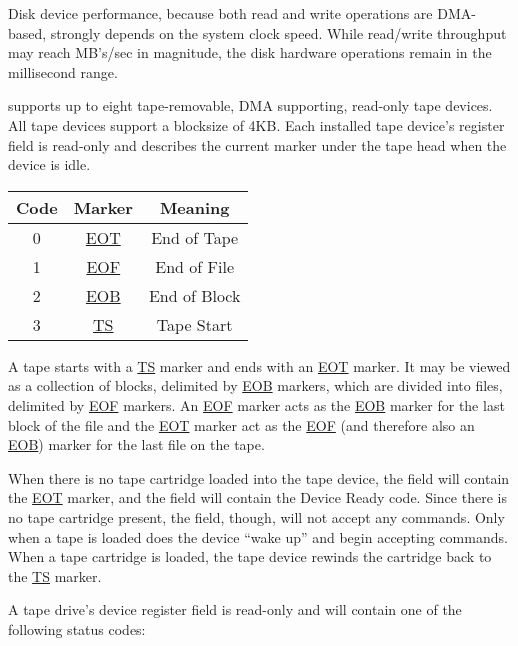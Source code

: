 Disk device performance, because both read and write operations are DMA-based, strongly depends on the system clock speed. 
While read/write throughput may reach MB’s/sec in magnitude, the disk hardware operations remain in the millisecond range.



\uarm{} supports up to eight tape-removable, DMA supporting, read-only tape devices.
All \uarm{} tape devices support a blocksize of 4KB. 
Each installed tape device’s register  field is read-only and describes the current marker under the tape head when the device is idle.

\begin{center}
	\begin{tabular}{|c|c|c|}
		\hline
		Code & Marker & Meaning\\
		\hline
		\hline
		0 & \uline{EOT} & End of Tape\\
		\hline
		1 & \uline{EOF} & End of File\\
		\hline
		2 & \uline{EOB} & End of Block\\
		\hline
		3 & \uline{TS} & Tape Start\\
		\hline
	\end{tabular}
\end{center}

A tape starts with a \uline{TS} marker and ends with an \uline{EOT} marker. 
It may be viewed as a collection of blocks, delimited by \uline{EOB} markers, which are divided into files, delimited by \uline{EOF} markers. 
An \uline{EOF} marker acts as the \uline{EOB} marker for the last block of the file and the \uline{EOT} marker act as the \uline{EOF} (and therefore also an \uline{EOB}) marker for the last file on the tape.

When there is no tape cartridge loaded into the tape device, the  field will contain the \uline{EOT} marker, and the  field will contain the Device Ready code. 
Since there is no tape cartridge present, the  field, though, will not accept any commands. 
Only when a tape is loaded does the device “wake up” and begin accepting commands. 
When a tape cartridge is loaded, the tape device rewinds the cartridge back to the \uline{TS} marker.

A tape drive’s device register  field is read-only and will contain one of the following status codes:


